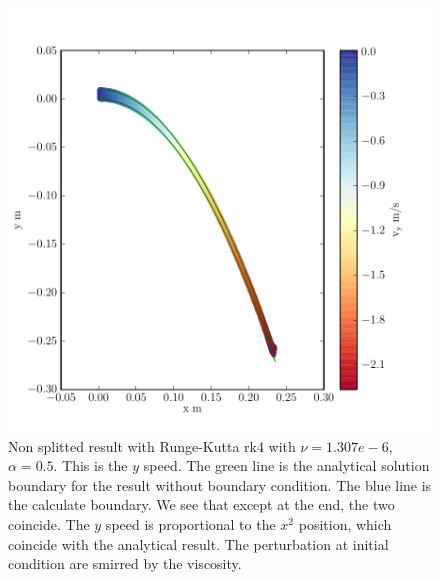 \begin{figure}
	\includegraphics{topology/lateral_jet/plot_8__2_186.pdf}
	\caption{Non splitted result with Runge-Kutta rk4 with $\nu=1.307e-6$, $\alpha=0.5$.
	This is the $y$ speed.
	The green line is the analytical solution boundary for the result without boundary condition.
	The blue line is the calculate boundary.
	We see that except at the end, the two coincide.
	The $y$ speed is proportional to the $x^2$ position, which coincide with the analytical result.
	The perturbation at initial condition are smirred by the viscosity.}
	\label{topo:extrap:lateral:8_2}
\end{figure}

